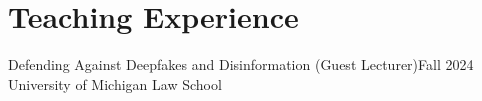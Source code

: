 \section{Teaching Experience}
  \CVSubHeadingListStart
    \CVSubheading
      {Defending Against Deepfakes and Disinformation (Guest Lecturer)}{Fall 2024}
      {University of Michigan Law School}{}
  \CVSubHeadingListEnd
